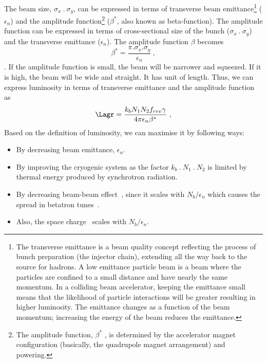 The beam size, $\sigma_x~.~\sigma_y$, can be expressed in terms of transverse beam emittance\footnote{The transverse emittance is a beam quality concept reflecting the process of bunch preparation (the injector chain), extending all the way back to the source for hadrons. A low emittance particle beam is a beam where the particles are confined to a small distance and have nearly the same momentum. In a colliding beam accelerator, keeping the emittance small means that the likelihood of particle interactions will be greater resulting in higher luminosity. The emittance changes as a function of the beam momentum; increasing the energy of the beam reduces the emittance.} ($\epsilon_n$) and the amplitude function\footnote{The amplitude function, $\beta^*$ , is determined by the accelerator magnet configuration (basically, the quadrupole magnet arrangement) and powering. } ($\beta^*$, also known as beta-function). The amplitude function can be expressed in terms of cross-sectional size of the bunch ($\sigma_x~.~\sigma_y$) and  the transverse emittance ($\epsilon_n$). The amplitude function $\beta$  becomes 
\begin{equation}\label{eq:beta_function}
	\beta^* = \frac{\pi.\sigma_x.\sigma_y}{\epsilon_n}~,
\end{equation}. 
If the amplitude function is small, the beam will be narrower and squeezed. If it is high, the beam will be wide and straight. It has unit of length. Thus, we can express luminosity in terms of transverse emittance and the amplitude function as
\begin{equation}\label{eq:luminosity2}
    \Lagr = \frac{k_bN_1N_2f_{rev}\gamma}{4 \pi \epsilon_n \beta^*}~,
\end{equation}
Based on the definition of luminosity, we can maximise it by following ways:
\begin{itemize}
    \item By decreasing beam emittance, $\epsilon_n$.
    \item By improving the cryogenic system as the factor $k_b~.~N_1~.~N_2$ is limited by thermal energy produced by synchrotron radiation.
    \item By decreasing beam-beam effect~\cite{Herr2014,Papotti2014}, since it scales with $N_b/ \epsilon_n$ which causes the spread in betatron tunes~\cite{Dubouchet2013}.
    \item Also, the space charge~\cite{Oeftiger2016} scales with $N_b/ \epsilon_n$.
\end{itemize}

